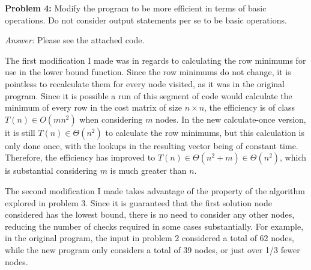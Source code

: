 \documentclass[11pt]{article}
\begin{document}
\textbf{Problem 4:} Modify the program to be more efficient in terms of 
basic operations. Do not consider output statements per se to be 
basic operations.

\textit{Answer:} Please see the attached code. 

The first modification I made was in regards to calculating the row minimums 
for use in the lower bound function. Since the row minimums do not change, 
it is pointless to recalculate them for every node visited, as it was in 
the original program. Since it is possible a run of this segment of code 
would calculate the minimum of every row in the cost matrix of size 
$n \times n$, the efficiency is of class $T(n) \in O(mn^2)$ when considering 
$m$ nodes. In the new calculate-once version, it is 
still $T(n) \in \Theta(n^2)$ to calculate the row minimums, but this 
calculation is only done once, with the lookups in the resulting vector being 
of constant time. Therefore, the efficiency has improved to 
$T(n) \in \Theta(n^2 + m) \in \Theta(n^2)$, which is substantial considering 
$m$ is much greater than $n$.

The second modification I made takes advantage of the property of the 
algorithm explored in problem 3. Since it is guaranteed that the first 
solution node considered has the lowest bound, there is no need to consider 
any other nodes, reducing the number of checks required in some cases 
substantially. For example, in the original program, the input in problem 2 
considered a total of 62 nodes, while the new program only considers a total 
of 39 nodes, or just over 1/3 fewer nodes.
\end{document}
